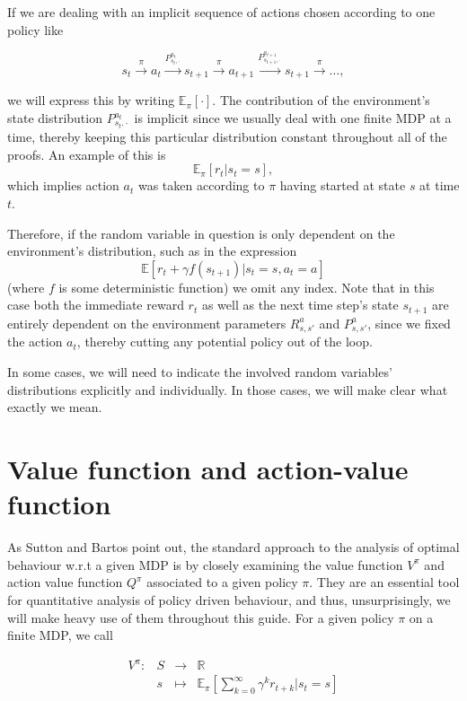 \documentclass[11pt]{article} %
\begin{document}
If we are dealing with an implicit sequence of actions chosen according to one policy like 

\begin{equation}\label{eq_trajIm}
	s_t \overset{\pi}{\rightarrow} a_t \overset{P^{a_t}_{s_t,\cdot}}{\rightarrow} s_{t+1} \overset{\pi}{\rightarrow} a_{t+1} \overset{P^{a_{t+1}}_{s_{t+1},\cdot}}{\rightarrow} s_{t+1} \overset{\pi}{\rightarrow} \dots,
\end{equation}

we will express this by writing $\mathbb{E}_{\pi}[\cdot]$. The contribution of the environment's state distribution $P^{a_t}_{s_t.\cdot}$ is implicit since we usually deal with one finite MDP at a time, thereby keeping this particular distribution constant throughout all of the proofs. An example of this is $$\mathbb{E}_{\pi}[r_t | s_t = s],$$ which implies action $a_t$ was taken according to $\pi$ having started at state $s$ at time $t$.

Therefore, if the random variable in question is only dependent on the environment's distribution, such as in the expression $$\mathbb{E}[r_t + \gamma f(s_{t+1}) | s_t = s, a_t = a]$$ (where $f$ is some deterministic function) we omit any index. Note that in this case both the immediate reward $r_t$ as well as the next time step's state $s_{t+1}$ are entirely dependent on the environment parameters $R^a_{s,s'}$ and $P^a_{s,s'}$, since we fixed the action $a_t$, thereby cutting any potential policy out of the loop.

In some cases, we will need to indicate the involved random variables' distributions explicitly and individually. In those cases, we will make clear what exactly we mean.

\section{Value function and action-value function}

As Sutton and Bartos point out, the standard approach to the analysis of optimal behaviour w.r.t a given MDP is by closely examining the value function $V^{\pi}$ and action value function $Q^{\pi}$ associated to a given policy $\pi$. They are an essential tool for quantitative analysis of policy driven behaviour, and thus, unsurprisingly, we will make heavy use of them throughout this guide. For a given policy $\pi$ on a finite MDP, we call

\begin{equation}\label{ar_valFunc}
	\begin{array}{llll}
		V^{\pi} :	& S 	& \to 	& \mathbb{R} \\
				& s	& \mapsto	& \mathbb{E}_{\pi}[\sum_{k=0}^{\infty} \gamma^k r_{t+k} | s_t = s]
	\end{array}
\end{equation}
\end{document}
